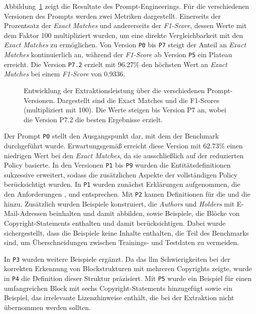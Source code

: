 Abbildung~\ref{fig:prompt-engineering-results} zeigt die Resultate des Prompt-Engineerings.
Für die verschiedenen Versionen des Prompts werden zwei Metriken dargestellt.
Einerseits der Prozentsatz der \textit{Exact Matches} und andererseits der \textit{F1-Score}, dessen Werte mit dem Faktor \num{100} multipliziert wurden, um eine direkte Vergleichbarkeit mit den \textit{Exact Matches} zu ermöglichen.
Von Version \texttt{P0} bis \texttt{P7} steigt der Anteil an \textit{Exact Matches} kontinuierlich an, während der \textit{F1-Score} ab Version \texttt{P5} ein Plateau erreicht.
Die Version \texttt{P7.2} erzielt mit \num{96.27}\% den höchsten Wert an \textit{Exact Matches} bei einem \textit{F1-Score} von \num{0.9336}.

\begin{figure}[ht]
    \centering
    \caption{Entwicklung der Extraktionsleistung über die verschiedenen Prompt-Versionen. Dargestellt sind die Exact Matches und die F1-Scores (multipliziert mit 100). Die Werte steigen bis Version P7 an, wobei die Version P7.2 die besten Ergebnisse erzielt.}
    \label{fig:prompt-engineering-results}
\end{figure}

Der Prompt \texttt{P0} stellt den Ausgangspunkt dar, mit dem der Benchmark durchgeführt wurde.
Erwartungsgemäß erreicht diese Version mit \num{62.73}\% einen niedrigen Wert bei den \textit{Exact Matches}, da sie ausschließlich auf der reduzierten Policy basierte.
In den Versionen \texttt{P1} bis \texttt{P9} wurden die Entitätsdefinitionen sukzessive erweitert, sodass die zusätzlichen Aspekte der vollständigen Policy berücksichtigt wurden.
In \texttt{P1} wurden zunächst Erklärungen aufgenommen, die den Anforderungen ,  und  entsprechen.
Mit \texttt{P2} kamen Definitionen für die  und die  hinzu.
Zusätzlich wurden Beispiele konstruiert, die \textit{Authors} und \textit{Holders} mit E-Mail-Adressen beinhalten und damit  abbilden, sowie Beispiele, die Blöcke von Copyright-Statements enthalten und damit  berücksichtigen.
Dabei wurde sichergestellt, dass die Beispiele keine Inhalte enthalten, die Teil des Benchmarks sind, um Überschneidungen zwischen Trainings- und Testdaten zu vermeiden.

In \texttt{P3} wurden weitere Beispiele ergänzt.
Da das \gls{llm} Schwierigkeiten bei der korrekten Erkennung von Blockstrukturen mit mehreren Copyrights zeigte, wurde in \texttt{P4} die Definition dieser Struktur präzisiert.
Mit \texttt{P5} wurde ein Beispiel für einen umfangreichen Block mit sechs Copyright-Statements hinzugefügt sowie ein Beispiel, das irrelevante Lizenzhinweise enthält, die bei der Extraktion nicht übernommen werden sollten.

